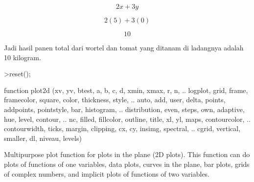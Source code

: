 \documentclass{article}
\begin{document}
\begin{eulernotebook}
\begin{eulercomment}
\begin{eulercomment}
\begin{eulercomment}
\begin{eulercomment}
\begin{eulercomment}
\end{eulercomment}
\begin{eulerformula}
\[
2x+3y
\]
\end{eulerformula}
\begin{eulerformula}
\[
2(5)+3(0)
\]
\end{eulerformula}
\begin{eulerformula}
\[
10
\]
\end{eulerformula}
\begin{eulercomment}
Jadi hasil panen total dari wortel dan tomat yang ditanam di ladangnya
adalah 10 kilogram.
\end{eulercomment}
\begin{eulerprompt}
>reset(); 
\end{eulerprompt}
\begin{eulercomment}
\end{eulercomment}
\begin{eulerttcomment}
  function plot2d (xv, yv, btest, a, b, c, d, xmin, xmax, r, n,  ..
  logplot, grid, frame, framecolor, square, color, thickness, style, ..
  auto, add, user, delta, points, addpoints, pointstyle, bar, histogram,  ..
  distribution, even, steps, own, adaptive, hue, level, contour,  ..
  nc, filled, fillcolor, outline, title, xl, yl, maps, contourcolor, ..
  contourwidth, ticks, margin, clipping, cx, cy, insimg, spectral,  ..
  cgrid, vertical, smaller, dl, niveau, levels)
\end{eulerttcomment}
\begin{eulercomment}
Multipurpose plot function for plots in the plane (2D plots). This function can do
plots of functions of one variables, data plots, curves in the plane, bar plots, grids
of complex numbers, and implicit plots of functions of two variables.


\end{eulercomment}
\end{eulercomment}
\end{eulercomment}
\end{eulercomment}
\end{eulercomment}
\end{eulernotebook}
\end{document}
